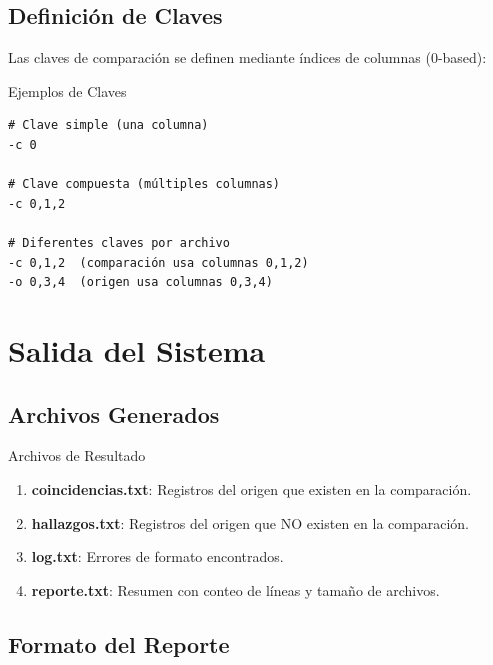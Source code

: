 
\subsection{Definición de Claves}

Las claves de comparación se definen mediante índices de columnas (0-based):

\begin{caja}{Ejemplos de Claves}
\begin{verbatim}
# Clave simple (una columna)
-c 0

# Clave compuesta (múltiples columnas)
-c 0,1,2

# Diferentes claves por archivo
-c 0,1,2  (comparación usa columnas 0,1,2)
-o 0,3,4  (origen usa columnas 0,3,4)
\end{verbatim}
\end{caja}


\section{Salida del Sistema}

\subsection{Archivos Generados}

\begin{caja}{Archivos de Resultado}
\begin{enumerate}
\item \textbf{coincidencias.txt}: Registros del origen que existen en la comparación.
\item \textbf{hallazgos.txt}: Registros del origen que NO existen en la comparación.
\item \textbf{log.txt}: Errores de formato encontrados.
\item \textbf{reporte.txt}: Resumen con conteo de líneas y tamaño de archivos.
\end{enumerate}
\end{caja}


\subsection{Formato del Reporte}

